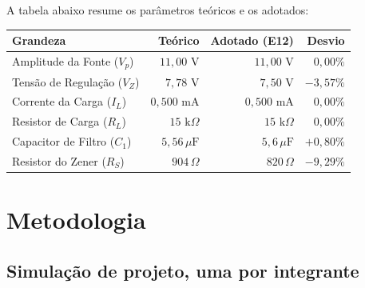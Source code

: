\documentclass[11pt,a4paper]{article}
\begin{document}
A tabela abaixo resume os parâmetros teóricos e os adotados:

\begin{center}
\renewcommand{\arraystretch}{1.2}
\begin{tabular}{@{}lrrr@{}}
\toprule
\textbf{Grandeza} & \textbf{Teórico} & \textbf{Adotado (E12)} & \textbf{Desvio} \\
\midrule
Amplitude da Fonte ($V_p$) & $11{,}00\text{ V}$ & $11{,}00\text{ V}$ & $0{,}00\%$ \\
Tensão de Regulação ($V_Z$) & $7{,}78\text{ V}$ & $7{,}50\text{ V}$ & $-3{,}57\%$ \\
Corrente da Carga ($I_L$) & $0{,}500\text{ mA}$ & $0{,}500\text{ mA}$ & $0{,}00\%$ \\
Resistor de Carga ($R_L$) & $15\text{ k}\Omega$ & $15\text{ k}\Omega$ & $0{,}00\%$ \\
Capacitor de Filtro ($C_1$) & $5{,}56\,\mu\text{F}$ & $5{,}6\,\mu\text{F}$ & $+0{,}80\%$ \\
Resistor do Zener ($R_S$) & $904\,\Omega$ & $820\,\Omega$ & $-9{,}29\%$ \\
\bottomrule
\end{tabular}
\end{center}

\section{Metodologia}



\subsection{Simulação de projeto, uma por integrante}

\end{document}
